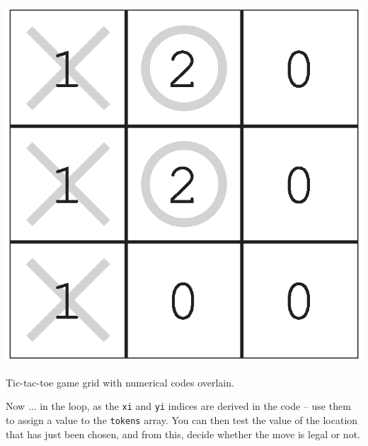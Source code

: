 \documentclass{tufte-book} %
\begin{document}
\begin{marginfigure}[-1.0in]
\includegraphics[width=\linewidth]{ch6-grid2.eps}
\caption{Tic-tac-toe game grid with numerical codes overlain.}
\label{fig:ch6-grid2}
\end{marginfigure}

Now ... in the loop, as the \texttt{xi} and \texttt{yi} indices are derived in the code -- use them to assign a value to the \texttt{tokens} array. You can then test  the value of the location that has just been chosen, and from this, decide whether the move is legal or not.
\end{document}
